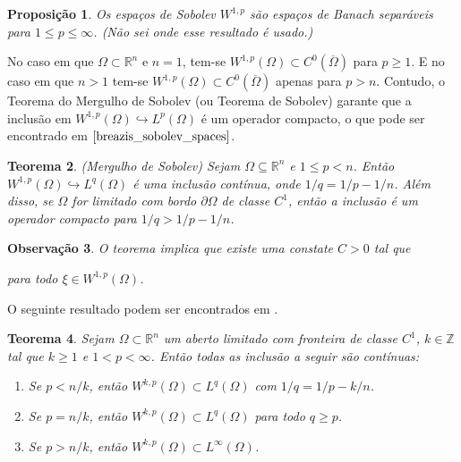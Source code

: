 \documentclass[12pt]{book}
\newtheorem{teorema}{Teorema}[section]
\newtheorem{observacao}[teorema]{Observação}
\newtheorem{proposicao}[teorema]{Proposição}
\newcommand{\espacoLp}[1]{L^{p}(#1)}
\newcommand{\espacoLpGeral}[2]{L^{#1}(#2)}
\newcommand{\espacosobolev}[1]{W^{1,p}(#1)}
\newcommand{\espacosobolevgeneralizado}[1]{W^{k,p}(#1)}
\newcommand{\inteiros}{\mathbb{Z}}
\newcommand{\real}[1]{\mathbb{R}^{#1}}
\newcommand{\alerta}[1]{{\color{red}#1}}
\begin{document}
	\alerta{
	
	\begin{proposicao}
		Os espaços de Sobolev $W^{1,p}$ são espaços de Banach separáveis para $1\leq p \leq \infty$.
		(Não sei onde esse resultado é usado.)
	\end{proposicao}
	}
	No caso em que $\Omega\subset\real{n}$ e $n=1$, tem-se $\espacosobolev{\Omega} \subset C^{0}(\overline{\Omega})$ para $p \geq 1$. E no caso em que $n>1$ tem-se $\espacosobolev{\Omega} \subset C^{0}(\overline{\Omega})$ apenas para $p>n$. Contudo, o Teorema do Mergulho de Sobolev (ou Teorema de Sobolev) garante que a inclusão em $\espacosobolev{\Omega}\hookrightarrow \espacoLp{\Omega}$ é um operador compacto, o que pode ser encontrado em $\cite{breazis_sobolev_spaces}$.	
	
	\begin{teorema}\label{teorema_sobolev}
		(Mergulho de Sobolev) Sejam $\Omega \subseteq \real{n}$ e $1 \leq p < n$. Então $\espacosobolev{\Omega} \hookrightarrow L^{q}(\Omega)$ é uma inclusão contínua, onde $1/q = 1/p -1/n$. Além disso, se $\Omega$ for limitado com bordo $\partial\Omega$ de classe $C^{1}$, então a inclusão é um operador compacto para $1/q>1/p -1/n$.
	\end{teorema}
	

	\begin{observacao}
		O teorema implica que existe uma constate $C>0$ tal que 
	
		para todo $\xi\in \espacosobolev{\Omega}$.
	\end{observacao}
	
	O seguinte resultado podem ser encontrados em \cite{audi_floer_homology}.
	
	
	
	\begin{teorema}\label{teorema_inclusao_sobolev}
		Sejam $\Omega \subset\real{n}$ um aberto limitado com fronteira de classe $C^{1}$, $k\in \inteiros$ tal que $k\geq 1$ e $1<p <\infty$. Então todas as inclusão a seguir são contínuas:
		\begin{enumerate}
			\item Se $p<n/k$, então $\espacosobolevgeneralizado{\Omega}\subset \espacoLpGeral{q}{\Omega} $ com $1/q=1/p - k/n$.
			
			\item Se $p=n/k$, então $\espacosobolevgeneralizado{\Omega}\subset \espacoLpGeral{q}{\Omega} $ para todo $q\geq p$.
			
			\item Se $p>n/k$, então $\espacosobolevgeneralizado{\Omega}\subset \espacoLpGeral{\infty}{\Omega} $.
		\end{enumerate}
	\end{teorema}
	
\end{document}
